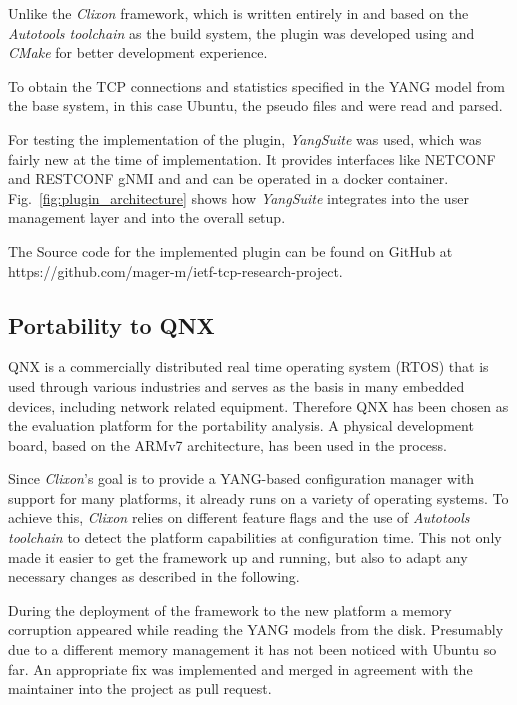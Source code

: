 Unlike the \textit{Clixon} framework, which is written entirely in  and based on the \textit{Autotools toolchain} as the build system, the plugin was developed using  and \textit{CMake} for better development experience.

To obtain the TCP connections and statistics specified in the YANG model from the base system, in this case Ubuntu, the pseudo files  and  were read and parsed.

For testing the implementation of the plugin, \textit{YangSuite} was used, which was fairly new at the time of implementation. It provides interfaces like NETCONF and RESTCONF gNMI and and can be operated in a docker container. Fig.~\ref{fig:plugin_architecture} shows how \textit{YangSuite} integrates into the user management layer and into the overall setup.

The Source code for the implemented plugin can be found on GitHub at https://github.com/mager-m/ietf-tcp-research-project.

\subsection{Portability to QNX}
\label{Portability to QNX}

QNX is a commercially distributed real time operating system (RTOS) that is used through various industries and serves as the basis in many embedded devices, including network related equipment. Therefore QNX has been chosen as the evaluation platform for the portability analysis. A physical development board, based on the ARMv7 architecture, has been used in the process.

Since \textit{Clixon}'s goal is to provide a YANG-based configuration manager with support for many platforms, it already runs on a variety of operating systems. To achieve this, \textit{Clixon} relies on different feature flags and the use of \textit{Autotools toolchain} to detect the platform capabilities at configuration time. This not only made it easier to get the framework up and running, but also to adapt any necessary changes as described in the following. 

During the deployment of the framework to the new platform a memory corruption appeared while reading the YANG models from the disk. Presumably due to a different memory management it has not been noticed with Ubuntu so far. An appropriate fix was implemented and merged in agreement with the maintainer into the project as pull request.

